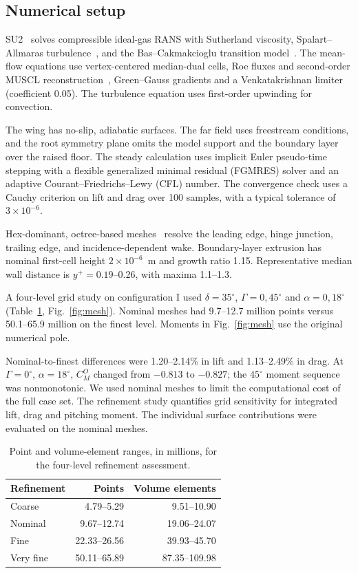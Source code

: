 \documentclass[journal]{new-aiaa}
\newcommand{\degc}{^\circ}
\begin{document}
\label{end:sec:references}
\subsection{Numerical setup}\label{sec:numerics}
SU2~\cite{palacios2013stanford} solves compressible ideal-gas RANS with Sutherland viscosity, Spalart--Allmaras turbulence~\cite{spalart1992sa}, and the Bas--Cakmakcioglu transition model~\cite{cakmakcioglu2020bcm}. The mean-flow equations use vertex-centered median-dual cells, Roe fluxes and second-order MUSCL reconstruction~\cite{van1979towards}, Green--Gauss gradients and a Venkatakrishnan limiter~\cite{venkatakrishnan1993accuracy} (coefficient 0.05). The turbulence equation uses first-order upwinding for convection.

\label{anchor:wall_model}The wing has no-slip, adiabatic surfaces. The far field uses freestream conditions, and the root symmetry plane omits the model support and the boundary layer over the raised floor. The steady calculation uses implicit Euler pseudo-time stepping with a flexible generalized minimal residual (FGMRES) solver and an adaptive Courant--Friedrichs--Lewy (CFL) number. The convergence check uses a Cauchy criterion on lift and drag over 100 samples, with a typical tolerance of $3\times10^{-6}$.

Hex-dominant, octree-based meshes~\cite{rausa2026monnalisa} resolve the leading edge, hinge junction, trailing edge, and incidence-dependent wake. Boundary-layer extrusion has nominal first-cell height $2\times10^{-6}$~m and growth ratio 1.15. Representative median wall distance is $y^+=0.19$--0.26, with maxima 1.1--1.3.

A four-level grid study on configuration I used $\delta=35\degc$, $\Gamma=0,45\degc$ and $\alpha=0,18\degc$ (Table~\ref{tab:mesh}, Fig.~\ref{fig:mesh}). Nominal meshes had 9.7--12.7 million points versus 50.1--65.9 million on the finest level. Moments in Fig.~\ref{fig:mesh} use the original numerical pole.

Nominal-to-finest differences were 1.20--2.14\% in lift and 1.13--2.49\% in drag. At $\Gamma=0\degc$, $\alpha=18\degc$, $C_M^O$ changed from $-0.813$ to $-0.827$; the $45\degc$ moment sequence was nonmonotonic. We used nominal meshes to limit the computational cost of the full case set. The refinement study quantifies grid sensitivity for integrated lift, drag and pitching moment. The individual surface contributions were evaluated on the nominal meshes.

\begin{table}[htbp]\centering
\caption{Point and volume-element ranges, in millions, for the four-level refinement assessment.}\label{tab:mesh}
\begin{tabular}{lrr}\toprule
Refinement & Points & Volume elements \\\midrule
Coarse & 4.79--5.29 & 9.51--10.90 \\
Nominal & 9.67--12.74 & 19.06--24.07 \\
Fine & 22.33--26.56 & 39.93--45.70 \\
Very fine & 50.11--65.89 & 87.35--109.98 \\
\bottomrule\end{tabular}\end{table}
\end{document}

